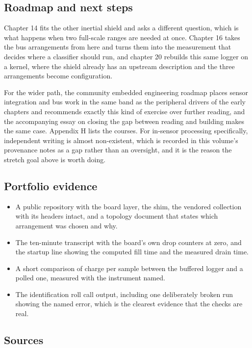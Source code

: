 \subsection*{Roadmap and next steps}

Chapter 14 fits the other inertial shield and asks a different question, which
is what happens when two full-scale ranges are needed at once. Chapter 16 takes
the bus arrangements from here and turns them into the measurement that decides
where a classifier should run, and chapter 20 rebuilds this same logger on a
kernel, where the shield already has an upstream description and the three
arrangements become configuration.

For the wider path, the community embedded engineering roadmap places sensor
integration and bus work in the same band as the peripheral drivers of the early
chapters and recommends exactly this kind of exercise over further reading, and
the accompanying essay on closing the gap between reading and building makes the
same case. Appendix H lists the courses. For in-sensor processing specifically,
independent writing is almost non-existent, which is recorded in this volume's
provenance notes as a gap rather than an oversight, and it is the reason the
stretch goal above is worth doing.

\subsection*{Portfolio evidence}

\begin{itemize}
\item A public repository with the board layer, the shim, the vendored
collection with its headers intact, and a topology document that states which
arrangement was chosen and why.
\item The ten-minute transcript with the board's own drop counters at zero, and
the startup line showing the computed fill time and the measured drain time.
\item A short comparison of charge per sample between the buffered logger and a
polled one, measured with the instrument named.
\item The identification roll call output, including one deliberately broken run
showing the named error, which is the clearest evidence that the checks are real.
\end{itemize}

\subsection*{Sources}

